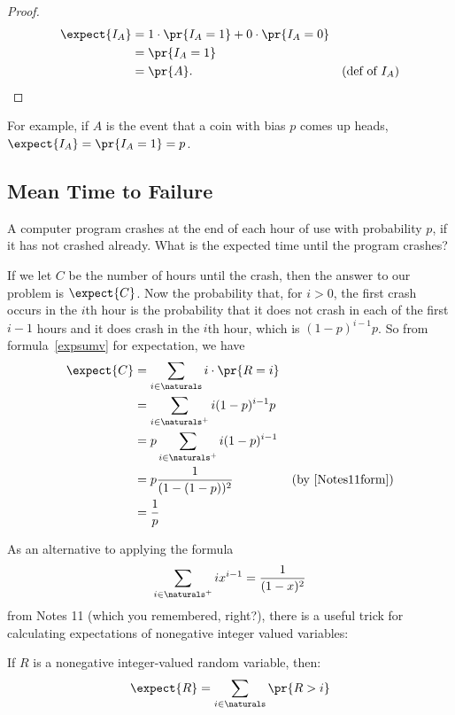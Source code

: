 \begin{proof}
\begin{align*}
\expect{I_A} 
& =  1 \cdot \pr{I_A = 1} + 0 \cdot \pr{I_A = 0} 
& 
\\
& = \pr{I_A = 1}
\\
& =  \pr{A}. & \text{(def of $I_A$)}
\end{align*}
\end{proof}
For example, if $A$ is the event that a coin
with bias $p$ comes up heads, $\expect{I_A} = \pr{I_A=1} = p$.


\subsection{Mean Time to Failure}

A computer program crashes at the end of each hour of use with probability
$p$, if it has not crashed already.  What is the expected time until the
program crashes?

If we let $C$ be the number of hours until the crash, then the answer to
our problem is $\expect{C}$.  Now the probability that, for $i >0$, the
first crash occurs in the $i$th hour is the probability that it does not
crash in each of the first $i-1$ hours and it does crash in the $i$th
hour, which is $(1-p)^{i-1}p$.  So from formula~\eqref{expsumv} for
expectation, we have
\begin{align*}
\expect{C} & = \sum_{i \in \naturals} i \cdot \pr{R=i}\\
           & = \sum_{i \in \naturals^+} i (1-p)^{i-1}p\\
           &= p \sum_{i \in \naturals^+} i (1-p)^{i-1}\\
           &= p\frac{1}{(1-(1-p))^2} & \text{(by~\eqref{Notes11form})}\\
           &= \frac{1}{p}
\end{align*}

As an alternative to applying the formula
\begin{equation}\label{Notes11form}
\sum_{i \in \naturals^{+}} ix^{i-1} =\frac{1}{(1-x)^2}
\end{equation}
from Notes 11 (which you remembered, right?), there is a useful trick for
calculating expectations of nonegative integer valued variables:
\begin{lemma}
If $R$ is a nonegative integer-valued random variable, then:
%
\begin{equation}\label{R>i}
\expect{R} = \sum_{i \in \naturals} \pr{R > i}
\end{equation}
\end{lemma}

